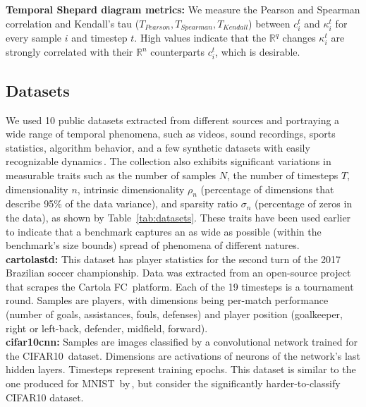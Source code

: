 \noindent\textbf{Temporal Shepard diagram metrics:} We measure the Pearson and Spearman correlation and Kendall's tau ($T_{Pearson}, T_{Spearman}, T_{Kendall}$) 
between $c_i^t$ and $\kappa_i^t$ for every sample $i$ and timestep $t$. High values indicate that the $\mathbb{R}^q$ changes $\kappa_i^t$ are strongly correlated with their $\mathbb{R}^n$ counterparts $c_i^t$, which is desirable.

\subsection{Datasets}
\label{sec:datasets}
%
We used 10 public datasets extracted from different sources and portraying a wide range of temporal phenomena, such as videos, sound recordings, sports statistics, algorithm behavior, and a few synthetic datasets with easily recognizable dynamics\,\citep{repo-guided}. The collection also exhibits significant variations in measurable traits such as the number of samples $N$, the number of timesteps $T$, dimensionality $n$, intrinsic dimensionality $\rho_n$ (percentage of dimensions that describe 95\% of the data variance), and sparsity ratio $\sigma_n$ (percentage of zeros in the data), as shown by Table~\ref{tab:datasets}. These traits have been used earlier\,\citep{Espadoto19} to indicate that a benchmark captures an as wide as possible (within the benchmark's size bounds) spread of phenomena of different natures.\\

\noindent\textbf{cartolastd:} This dataset has player statistics for the second turn of the 2017 Brazilian soccer championship. Data was extracted from an open-source project\,\citep{dataset:cartola} that scrapes the Cartola FC\,\citep{dataset:cartola} platform. Each of the 19 timesteps is a tournament round. Samples are players, with dimensions being per-match performance (number of goals, assistances, fouls, defenses) and player position (goalkeeper, right or left-back, defender, midfield, forward).\\

\noindent\textbf{cifar10cnn:} Samples are images classified by a convolutional network trained for the CIFAR10\,\citep{dataset:cifar10} dataset. 
Dimensions are activations of neurons of the network's last hidden layers. Timesteps represent training epochs. This dataset is similar to the one produced for MNIST\,\citep{dataset:mnist} by\,\cite{Rauber2017}, but consider the significantly harder-to-classify CIFAR10 dataset.\\


